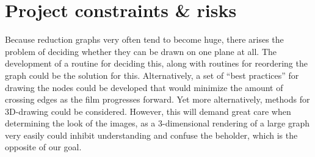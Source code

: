 
\chapter{Project constraints \& risks}
Because reduction graphs very often tend to become huge, there arises the
problem of deciding whether they can be drawn on one plane at all. The
development of a routine for deciding this, along with routines for reordering
the graph could be the solution for this. Alternatively, a set of ``best
practices'' for drawing the nodes could be developed that would minimize the
amount of crossing edges as the film progresses forward. Yet more
alternatively, methods for 3D-drawing could be considered. However, this will
demand great care when determining the look of the images, as a 3-dimensional
rendering of a large graph very easily could inhibit understanding and confuse
the beholder, which is the opposite of our goal.